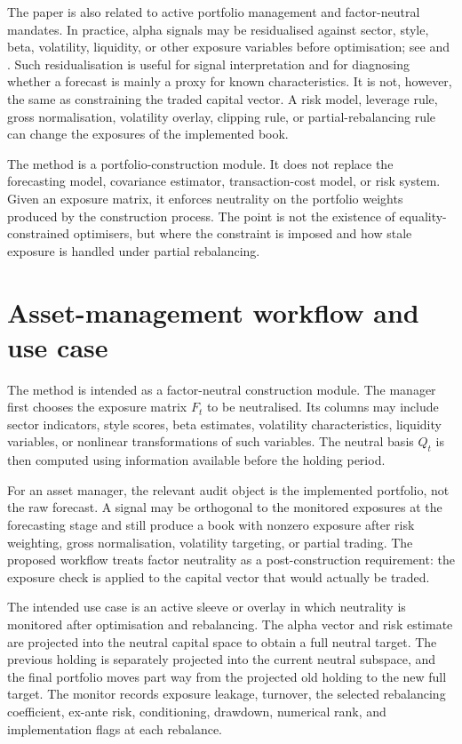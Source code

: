 \documentclass[11pt]{article}
\begin{document}
The paper is also related to active portfolio management and factor-neutral mandates.  In practice,
alpha signals may be residualised against sector, style, beta, volatility, liquidity, or other exposure
variables before optimisation; see \citet{GrinoldKahn2000} and \citet{ClarkeDeSilvaThorley2002}.  Such
residualisation is useful for signal interpretation and for diagnosing whether a forecast is mainly a proxy
for known characteristics.  It is not, however, the same as constraining the traded capital vector.  A risk
model, leverage rule, gross normalisation, volatility overlay, clipping rule, or partial-rebalancing rule can
change the exposures of the implemented book.

The method is a portfolio-construction module.  It does not replace the forecasting model, covariance
estimator, transaction-cost model, or risk system.  Given an exposure matrix, it enforces neutrality on
the portfolio weights produced by the construction process.  The point is not the existence of
equality-constrained optimisers, but where the constraint is imposed and how stale exposure is handled
under partial rebalancing.

\section{Asset-management workflow and use case}

The method is intended as a factor-neutral construction module. The manager first chooses the exposure
matrix $F_t$ to be neutralised. Its columns may include sector indicators, style scores, beta estimates,
volatility characteristics, liquidity variables, or nonlinear transformations of such variables. The neutral
basis $Q_t$ is then computed using information available before the holding period.

For an asset manager, the relevant audit object is the implemented portfolio, not the raw forecast.  A
signal may be orthogonal to the monitored exposures at the forecasting stage and still produce a book
with nonzero exposure after risk weighting, gross normalisation, volatility targeting, or partial trading.
The proposed workflow treats factor neutrality as a post-construction requirement: the exposure check is
applied to the capital vector that would actually be traded.

The intended use case is an active sleeve or overlay in which neutrality is monitored after optimisation
and rebalancing.  The alpha vector and risk estimate are projected into the neutral capital space to obtain
a full neutral target.  The previous holding is separately projected into the current neutral subspace, and
the final portfolio moves part way from the projected old holding to the new full target.  The monitor
records exposure leakage, turnover, the selected rebalancing coefficient, ex-ante risk, conditioning,
drawdown, numerical rank, and implementation flags at each rebalance.
\end{document}
